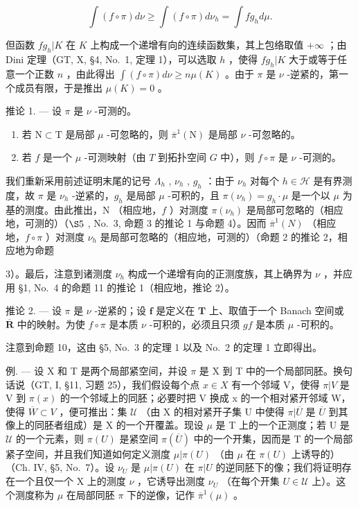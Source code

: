 \[
\int (f \circ \pi) d \nu \geqslant \int (f \circ \pi) d \nu_ {h} = \int f g _ {h} d \mu .
\]

但函数 \(fg_h|K\) 在 \(K\) 上构成一个递增有向的连续函数集，其上包络取值 \(+\infty\) ；由 Dini 定理（GT, X, §4, No.~1, 定理 1），可以选取 \(h\) ，使得 \(fg_h|K\) 大于或等于任意一个正数 \(n\) ，由此得出 \(\int(f \circ \pi) d\nu \geqslant n \mu(K)\) 。由于 \(\pi\) 是 \(\nu\) -逆紧的，第一个成员有限，于是推出 \(\mu(K) = 0\) 。

推论 1. --- 设 \(\pi\) 是 \(\nu\) -可测的。

\begin{enumerate}
\def\labelenumi{\alph{enumi})}
\item
  若 \(\mathrm{N}\subset \mathrm{T}\) 是局部 \(\mu\) -可忽略的，则 \(\overline{\pi}^{1}(\mathrm{N})\) 是局部 \(\nu\) -可忽略的。
\item
  若 \(f\) 是一个 \(\mu\) -可测映射（由 \(T\) 到拓扑空间 \(G\) 中），则 \(f \circ \pi\) 是 \(\nu\) -可测的。
\end{enumerate}

我们重新采用前述证明末尾的记号 \(\Lambda_h\) , \(\nu_h\) , \(g_h\) ：由于 \(\nu_h\) 对每个 \(h \in \mathcal{H}\) 是有界测度，故 \(\pi\) 是 \(\nu_h\) -逆紧的，\(g_h\) 是局部 \(\mu\) -可积的，且 \(\pi(\nu_h) = g_h \cdot \mu\) 是一个以 \(\mu\) 为基的测度。由此推出，N （相应地，\(f\) ）对测度 \(\pi(\nu_h)\) 是局部可忽略的（相应地，可测的）（\(\S 5\) , No.~3, 命题 3 的推论 1 与命题 4）。因而 \(\overline{\pi}^1(N)\) （相应地，\(f \circ \pi\) ）对测度 \(\nu_h\) 是局部可忽略的（相应地，可测的）（命题 2 的推论 2，相应地为命题

3）。最后，注意到诸测度 \(\nu_{h}\) 构成一个递增有向的正测度族，其上确界为 \(\nu\) ，并应用 §1, No.~4 的命题 11 的推论 1（相应地，推论 2）。

推论 2. --- 设 \(\pi\) 是 \(\nu\) -逆紧的；设 \(\mathbf{f}\) 是定义在 \(\mathbf{T}\) 上、取值于一个 Banach 空间或 \(\overline{\mathbf{R}}\) 中的映射。为使 \(f \circ \pi\) 是本质 \(\nu\) -可积的，必须且只须 \(gf\) 是本质 \(\mu\) -可积的。

注意到命题 10，这由 §5, No.~3 的定理 1 以及 No.~2 的定理 1 立即得出。

例. --- 设 X 和 T 是两个局部紧空间，并设 \(\pi\) 是 X 到 T 中的一个局部同胚。换句话说（GT, I, §11, 习题 25），我们假设每个点 \(x \in X\) 有一个邻域 V，使得 \(\pi|V\) 是 V 到 \(\pi(x)\) 的一个邻域上的同胚；必要时把 V 换成 x 的一个相对紧开邻域 W，使得 \(\overline{W} \subset V\) ，便可推出：集 \(\mathcal{U}\) （由 X 的相对紧开子集 U 中使得 \(\pi|\overline{U}\) 是 \(\overline{U}\) 到其像上的同胚者组成）是 X 的一个开覆盖。现设 \(\mu\) 是 T 上的一个正测度；若 U 是 \(\mathcal{U}\) 的一个元素，则 \(\pi(U)\) 是紧空间 \(\pi(\overline{U})\) 中的一个开集，因而是 T 的一个局部紧子空间，并且我们知道如何定义测度 \(\mu|\pi(U)\) （由 \(\mu\) 在 \(\pi(U)\) 上诱导的）（Ch. IV, §5, No.~7）。设 \(\nu_{U}\) 是 \(\mu|\pi(U)\) 在 \(\pi|U\) 的逆同胚下的像；我们将证明存在一个且仅一个 X 上的测度 \(\nu\) ，它诱导出测度 \(\nu_{U}\) （在每个开集 \(U \in \mathcal{U}\) 上）。这个测度称为 \(\mu\) 在局部同胚 \(\pi\) 下的逆像，记作 \(\overline{\pi}^{1}(\mu)\) 。

